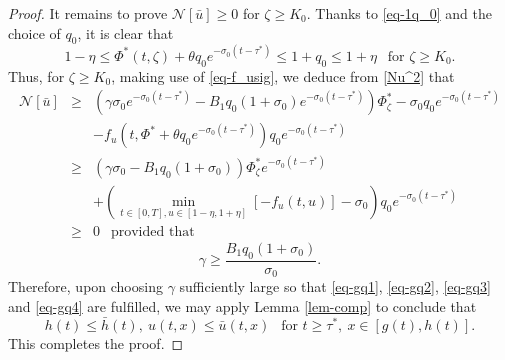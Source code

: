 \documentclass[11pt]{amsart}
\numberwithin{equation}{section}
\begin{document}
\begin{proof}
It remains to prove  $\mathcal{N}[\bar{u}]\geq 0$  for   $\zeta\geq K_0$.
Thanks to \eqref{eq-1q_0} and the choice of $q_0$, it is clear that  
\begin{equation*}
 1-\eta\leq  \Phi^*(t,\zeta)+\theta q_0e^{-\sigma_0(t-\tau^{*})}\leq 1+q_0\leq 1+\eta ~~\text{ for }\zeta\geq K_0.
\end{equation*}
Thus, for $\zeta\geq K_0$, making use of  \eqref{eq-f_usig}, we deduce from  \eqref{Nu^2} that 
\begin{eqnarray*}
  \mathcal{N}[\bar{u}]&\geq  &(\gamma\sigma_0e^{-\sigma_0(t-\tau^{*})}-B_1q_0(1+\sigma_0)e^{-\sigma_0(t-\tau^*)})\Phi_\zeta^*-\sigma_0q_0e^{-\sigma_0(t-\tau^{*})}\nonumber\\
&&-f_u(t,\Phi^*+\theta q_0e^{-\sigma_0(t-\tau^{*})})q_0e^{-\sigma_0(t-\tau^{*})}\\
&\geq &(\gamma\sigma_0-B_1q_0(1+\sigma_0))\Phi_\zeta^* e^{-\sigma_0(t-\tau^{*})} \nonumber\\
&&+\left(\min_{t\in[0,T],u\in[1-\eta,1+\eta]}[-f_u(t,u)]-\sigma_0\right)q_0e^{-\sigma_0(t-\tau^{*})}\\
&\geq& 0\ \ \mbox{ provided that }
\end{eqnarray*}
\begin{equation}\label{eq-gq4}
  \gamma\geq \frac{B_1q_0(1+\sigma_0)}{\sigma_0}.
\end{equation}
Therefore, upon choosing $\gamma$ sufficiently large so that   \eqref{eq-gq1}, \eqref{eq-gq2}, \eqref{eq-gq3} and \eqref{eq-gq4} are fulfilled,  we may apply Lemma \ref{lem-comp} to conclude that 
\begin{equation*}
  h(t)\leq \bar{h}(t),\ u(t,x)\leq \bar{u}(t,x) ~~\text{ for }t\geq \tau^*,~x\in[g(t),h(t)].
\end{equation*}
This completes the proof.
\end{proof}
\end{document}

